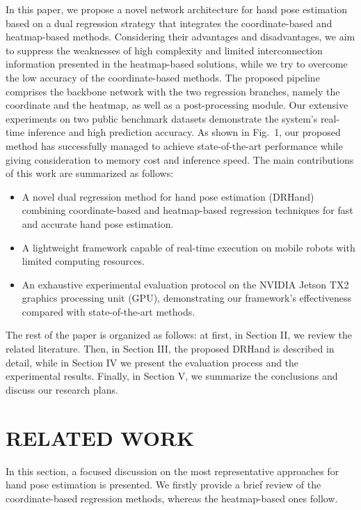\documentclass[11pt]{article}
\begin{document}
In this paper, we propose a novel network architecture for hand pose estimation based on a dual regression strategy that integrates the coordinate-based and heatmap-based methods. Considering their advantages and disadvantages, we aim to suppress the weaknesses of high complexity and limited interconnection information presented in the heatmap-based solutions, while we try to overcome the low accuracy of the coordinate-based methods. The proposed pipeline comprises the backbone network with the two regression branches, namely the coordinate and the heatmap, as well as a post-processing module. Our extensive experiments on two public benchmark datasets demonstrate the system’s real-time inference and high prediction accuracy. As shown in Fig.\ 1, our proposed method has successfully managed to achieve state-of-the-art performance while giving consideration to memory cost and inference speed. The main contributions of this work are summarized as follows:
\begin{itemize}[leftmargin=1.25em]
\item A novel dual regression method for hand pose estimation (DRHand) combining coordinate-based and heatmap-based regression techniques for fast and accurate hand pose estimation.
\item A lightweight framework capable of real-time execution on mobile robots with limited computing resources.
\item An exhaustive experimental evaluation protocol on the NVIDIA Jetson TX2 graphics processing unit (GPU), demonstrating our framework’s effectiveness compared with state-of-the-art methods.
\end{itemize}
The rest of the paper is organized as follows: at first, in Section II, we review the related literature. Then, in Section III, the proposed DRHand is described in detail, while in Section IV we present the evaluation process and the experimental results. Finally, in Section V, we summarize the conclusions and discuss our research plans.

\section{RELATED WORK}
In this section, a focused discussion on the most representative approaches for hand pose estimation is presented. We firstly provide a brief review of the coordinate-based regression methods, whereas the heatmap-based ones follow.
\end{document}
